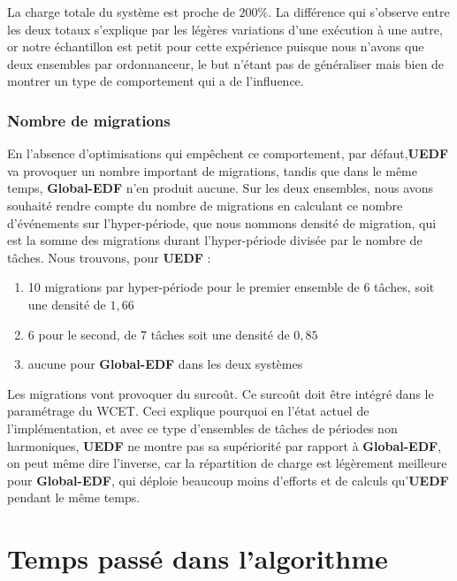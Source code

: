 	La charge totale du système est proche de $200\%$. La différence qui s'observe 
	entre les deux totaux s'explique par les légères variations d'une exécution à une autre, or notre échantillon est 
	petit pour cette expérience puisque nous n'avons que deux ensembles par ordonnanceur, le but n'étant pas de 
	généraliser mais bien de montrer un type de comportement qui a de l'influence.\newline
	
	
	\subsubsection{Nombre de migrations}
	
	En l'absence d'optimisations qui empêchent ce comportement, par défaut,\textbf{UEDF} va provoquer un nombre 
	important de migrations, tandis que dans le même temps, \textbf{Global-EDF} n'en produit aucune.
	Sur les deux ensembles, nous avons souhaité rendre compte du nombre de migrations en calculant 
	ce nombre d'événements sur l'hyper-période, que nous nommons \og{}densité de migration\fg{}, qui est 
	la somme des migrations durant l'hyper-période divisée par le nombre de tâches. 
	Nous trouvons, pour \textbf{UEDF} : 
	\begin{enumerate}
		\item 10 migrations par hyper-période pour le premier ensemble de 6 tâches, soit une densité de $1,66$
		\item 6 pour le second, de 7 tâches soit une densité de $0,85$
		\item aucune pour \textbf{Global-EDF} dans les deux systèmes
	\end{enumerate}

	Les migrations vont provoquer du surcoût. Ce surcoût doit être intégré dans le paramétrage du WCET. 
	Ceci explique pourquoi en l'état actuel de l'implémentation, et avec ce type d'ensembles de tâches 
	de périodes non harmoniques, \textbf{UEDF} ne montre pas sa 
	supériorité par rapport à \textbf{Global-EDF}, on peut même dire l'inverse, car 
	la répartition de charge est légèrement meilleure pour \textbf{Global-EDF}, qui déploie 
	beaucoup moins d'efforts et de calculs qu'\textbf{UEDF} pendant le même temps.\newline
	
	
	\section{Temps passé dans l'algorithme}
	

